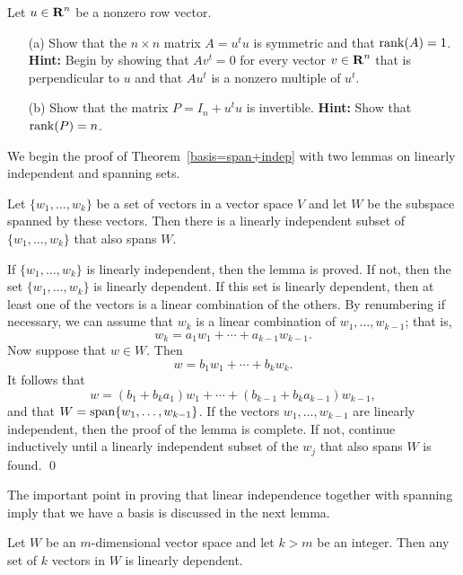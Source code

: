 \begin{exercise} \label{c5.5.7}
Let $u\in\mbox{$\bf{R}$}^n$ be a nonzero row vector.
\begin{itemize}
\item[(a)]  Show that the $n\times n$ matrix $A=u^tu$ is symmetric and that
${\rm rank}(A)=1$.  {\bf Hint:}  Begin by showing that $Av^t=0$ for every vector
$v\in\mbox{$\bf{R}$}^n$ that is perpendicular to $u$ and that $Au^t$ is a nonzero multiple
of $u^t$.
\item[(b)]  Show that the matrix $P=I_n+u^tu$ is invertible.  {\bf Hint:}
Show that ${\rm rank}(P)=n$.
\end{itemize}
\end{exercise}


 \label{S:5.6}

We begin the proof of Theorem~\ref{basis=span+indep} with two
lemmas on linearly independent and spanning sets.

\begin{lemma}  \label{reducetoindep}
Let $\{w_1,\ldots,w_k\}$ be a set of vectors in a vector space
$V$ and let $W$ be the subspace spanned by these vectors.  Then
there is a linearly independent subset of $\{w_1,\ldots,w_k\}$
that also spans $W$.
\end{lemma}

\proof If $\{w_1,\ldots,w_k\}$ is linearly independent, then the
lemma is proved.  If not, then the set $\{w_1,\ldots,w_k\}$ is
linearly dependent.  If this set is linearly dependent, then at
least one of the vectors is a linear combination of the others.
By renumbering if necessary, we can assume that $w_k$ is a
linear combination of $w_1,\ldots,w_{k-1}$; that is,
\[
w_k = a_1w_1 + \cdots + a_{k-1}w_{k-1}.
\]
Now suppose that $w\in W$.  Then
\[
w = b_1w_1 + \cdots + b_kw_k.
\]
It follows that
\[
w = (b_1+b_ka_1)w_1 + \cdots + (b_{k-1}+b_ka_{k-1})w_{k-1},
\]
and that $W={\rm span}\{w_1,\ldots,w_{k-1}\}$.  If the vectors
$w_1,\ldots,w_{k-1}$ are linearly independent, then the proof of
the lemma is complete.  If not, continue inductively until a
linearly independent subset of the $w_j$ that also spans $W$ is
found.  \qed

The important point in proving that linear independence together
with spanning imply that we have a basis is discussed in the next
lemma.

\begin{lemma}  \label{lem:lindep}
Let $W$ be an $m$-dimensional vector space and let $k>m$ be an integer.
Then any set of $k$ vectors in $W$ is linearly dependent.
\end{lemma} 

